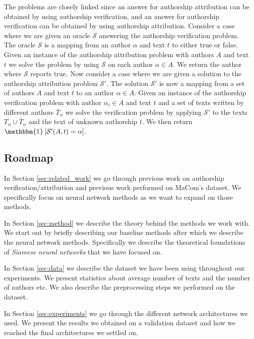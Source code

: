 The problems are closely linked since an answer for authorship attribution can
be obtained by using authorship verification, and an answer for authorship
verification can be obtained by using authorship attribution. Consider a
case where we are given an oracle $\mathcal{S}$ answering the authorship
verification problem. The oracle $\mathcal{S}$ is a mapping from an author
$\alpha$ and text $t$ to either true or false. Given an instance of the
authorship attribution problem with authors $A$ and text $t$ we solve the
problem by using $\mathcal{S}$ on each author $\alpha \in A$. We return
the author where $\mathcal{S}$ reports true. Now consider a case where we
are given a solution to the authorship attribution problem $\mathcal{S}'$.
The solution $\mathcal{S}'$ is now a mapping from a set of authors $A$ and
text $t$ to an author $\alpha \in A$. Given an instance of the authorship
verification problem with author $\alpha_i \in A$ and text $t$ and a set
of texts written by different authors $\overline{T}_{\alpha}$ we solve the
verification problem by applying $\mathcal{S}'$ to the texts $T_{\alpha} \cup
\overline{T}_{\alpha}$ and the text of unknown authorship $t$. We then return
$\mathbbm{1}\left[\mathcal{S}'(A, t) = \alpha\right]$.

\subsection{Roadmap}

In Section \ref{sec:related_work} we go through previous work on authorship
verification/attribution and previous work performed on MaCom's dataset. We
specifically focus on neural network methods as we want to expand on those
methods.

In Section \ref{sec:method} we describe the theory behind the methods we work
with. We start out by briefly describing our baseline methods after which we
describe the neural network methods. Specifically we describe the theoretical
foundations of \textit{Siamese neural networks} that we have focused on.

In Section \ref{sec:data} we describe the dataset we have been using throughout
our experiments. We present statistics about average number of texts and the
number of authors etc. We also describe the preprocessing steps we performed on
the dataset.

In Section \ref{sec:experiments} we go through the different network
architectures we used. We present the results we obtained on a validation
dataset and how we reached the final architectures we settled on.

